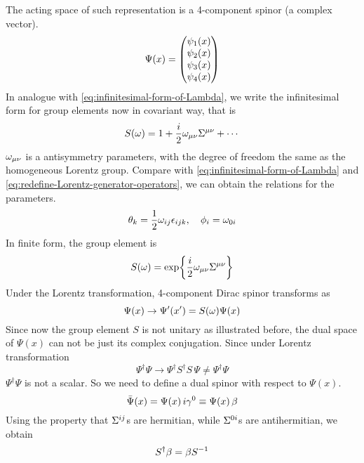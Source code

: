 The acting space of such representation is a 4-component spinor (a complex vector).
\begin{equation}
  \Psi(x) = \mqty(\psi_1(x)\\ \psi_2(x)\\ \psi_3(x)\\ \psi_4(x))
\end{equation}
In analogue with \eqref{eq:infinitesimal-form-of-Lambda}, we write the infinitesimal form for group elements now in covariant way, that is
\begin{equation} \label{the infinitesimal form of Sla}
S(\omega) = 1+ \frac{i}{2}\omega_{\mu\nu}\Sigma^{\mu\nu}+\cdots
\end{equation}
$\omega_{\mu\nu}$ is a antisymmetry parameters, with the degree of freedom  the same as the homogeneous Lorentz group. Compare with \eqref{eq:infinitesimal-form-of-Lambda} and \eqref{eq:redefine-Lorentz-generator-operators}, we can obtain the relations for the parameters.
\begin{equation} \label{parameter redefinition}
\theta_k = \frac{1}{2} \omega_{ij}\epsilon_{ijk}, \quad \phi_i = \omega_{0i}
\end{equation}
In finite form, the group element is
\begin{equation} \label{the finite form of Sla}
S(\omega) = \exp{\frac{i}{2}\omega_{\mu\nu}\Sigma^{\mu\nu}}
\end{equation}
Under the Lorentz transformation, 4-component Dirac spinor transforms as
\begin{equation} \label{Lorentz transformation of Dirac spinor}
\Psi(x)\rightarrow\Psi'(x') = S(\omega)\Psi(x)
\end{equation}
Since now the group element $S$ is not unitary as illustrated before, the dual space of $\Psi(x)$ can not be just its complex conjugation. Since under Lorentz  transformation
\begin{equation}
  \Psi^{\dagger} \Psi
\rightarrow
\Psi^{\dagger} S^{\dagger} S \, \Psi \neq \Psi^{\dagger} \Psi
\end{equation}
$\Psi^{\dagger} \Psi $ is not a scalar.
So we need to define a dual spinor with respect to $\Psi(x)$.
\begin{equation} \label{definition of dual spinor}
\bar{\Psi}(x) = \Psi(x)\,i\gamma^0 \equiv \Psi(x)\,\beta
\end{equation}
Using the property that $\Sigma^{ij}$s are hermitian, while $\Sigma^{0i}$s are antihermitian, we obtain
\begin{equation} \label{property of S(lambda)}
S^{\dagger} \beta = \beta S^{-1}
\end{equation}
